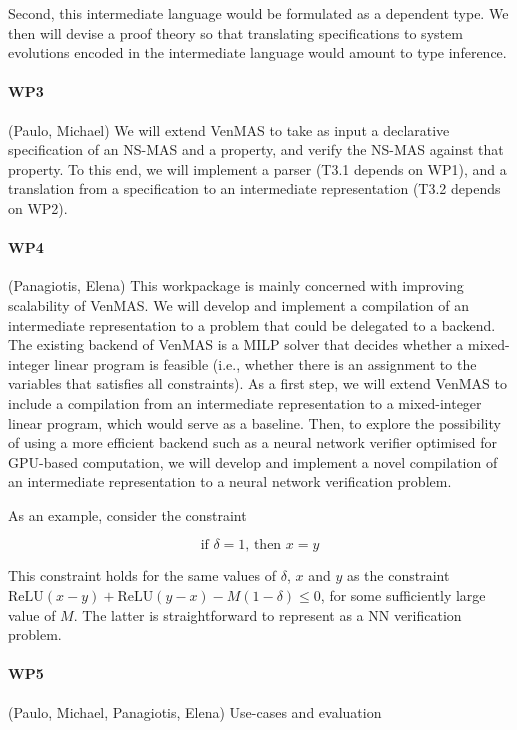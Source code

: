 \documentclass[11pt]{article}
\begin{document}
Second, this intermediate language would be formulated as a dependent
type. We then will devise a proof theory so that translating
specifications to system evolutions encoded in the intermediate
language would amount to type inference.

\paragraph{WP3} (Paulo, Michael) We will extend VenMAS to take as
input a declarative specification of an NS-MAS and a property, and
verify the NS-MAS against that property. To this end, we will
implement a parser (T3.1 depends on WP1), and a translation from a
specification to an intermediate representation (T3.2 depends on WP2).

\paragraph{WP4} (Panagiotis, Elena) This workpackage is mainly
concerned with improving scalability of VenMAS. We will develop and
implement a compilation of an intermediate representation to a problem
that could be delegated to a backend. The existing backend of VenMAS
is a MILP solver that decides whether a mixed-integer linear program
is feasible (i.e., whether there is an assignment to the variables
that satisfies all constraints). As a first step, we will extend
VenMAS to include a compilation from an intermediate representation to
a mixed-integer linear program, which would serve as a baseline.
Then, to explore the possibility of using a more efficient backend
such as a neural network verifier optimised for GPU-based computation,
we will develop and implement a novel compilation of an intermediate
representation to a neural network verification problem.

As an example, consider the constraint

\[
    \text{if }\delta = 1\text{, then }x = y
\]

This constraint holds for the same values of $\delta$, $x$ and $y$ as
the constraint
$\text{ReLU}(x-y) + \text{ReLU}(y-x) - M(1 - \delta) \leq 0$, for some
sufficiently large value of $M$. The latter is straightforward to
represent as a NN verification problem.

\paragraph{WP5} (Paulo, Michael, Panagiotis, Elena) Use-cases and evaluation 
\end{document}
